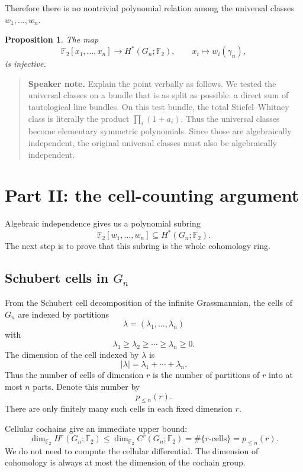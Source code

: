 \documentclass[11pt]{article}
\newtheorem{proposition}[theorem]{Proposition}
\theoremstyle{remark}
\newcommand{\F}{\mathbb F}
\newcommand{\Gn}{G_n}
\newcommand{\gamman}{\gamma_n}
\newenvironment{talknote}{\begin{quote}\small\textbf{Speaker note.} }{\end{quote}}
\begin{document}
Therefore there is no nontrivial polynomial relation among the universal classes $w_1,\dots,w_n$.

\begin{proposition}\label{prop:poly-injective}
The map
\[
  \F_2[x_1,\dots,x_n]\to H^*(\Gn;\F_2),
  \qquad x_i\longmapsto w_i(\gamman),
\]
is injective.
\end{proposition}

\begin{talknote}
Explain the point verbally as follows.  We tested the universal classes on a bundle that is as split as possible: a direct sum of tautological line bundles.  On this test bundle, the total Stiefel--Whitney class is literally the product $\prod_i(1+a_i)$.  Thus the universal classes become elementary symmetric polynomials.  Since those are algebraically independent, the original universal classes must also be algebraically independent.
\end{talknote}

\section{Part II: the cell-counting argument}

Algebraic independence gives us a polynomial subring
\[
  \F_2[w_1,\dots,w_n]\subseteq H^*(\Gn;\F_2).
\]
The next step is to prove that this subring is the whole cohomology ring.

\subsection{Schubert cells in $\Gn$}

From the Schubert cell decomposition of the infinite Grassmannian, the cells of $\Gn$ are indexed by partitions
\[
  \lambda=(\lambda_1,\dots,\lambda_n)
\]
with
\[
  \lambda_1\ge \lambda_2\ge\cdots\ge \lambda_n\ge 0.
\]
The dimension of the cell indexed by $\lambda$ is
\[
  |\lambda|=\lambda_1+\cdots+\lambda_n.
\]
Thus the number of cells of dimension $r$ is the number of partitions of $r$ into at most $n$ parts.  Denote this number by
\[
  p_{\le n}(r).
\]
There are only finitely many such cells in each fixed dimension $r$.

Cellular cochains give an immediate upper bound:
\[
  \dim_{\F_2}H^r(\Gn;\F_2)
  \le \dim_{\F_2}C^r(\Gn;\F_2)
  = \#\{\text{$r$-cells}\}=p_{\le n}(r).
\]
We do not need to compute the cellular differential.  The dimension of cohomology is always at most the dimension of the cochain group.
\end{document}

